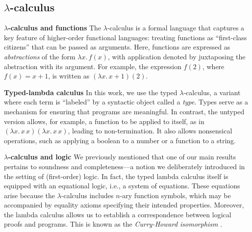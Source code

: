 


\subsection*{ $\lambda$-calculus}
\noindent \textbf{$\lambda$-calculus and functions}
The $\lambda$-calculus is a formal language that captures a key feature of higher-order functional languages: treating functions as ``first-class citizens'' that can be passed as arguments. Here, functions are expressed as \emph{abstractions} of the form $\lambda x.\,f(x)$, with application denoted by juxtaposing the abstraction with its argument. For example, the expression $f(2)$, where $f(x) = x + 1$, is written as $(\lambda x.\,x + 1)(2)$.



\noindent \textbf{Typed-lambda calculus}
In this work, we use the typed $\lambda$-calculus, a variant where each term is ``labeled'' by a syntactic object called a \emph{type}. Types serve as a mechanism for ensuring that programs are meaningful. In contrast, the untyped version allows, for example, a function to be applied to itself, as in $(\lambda x.\,x\,x)(\lambda x.\,x\,x)$, leading to non-termination. It also allows nonsensical operations, such as applying a boolean to a number or a function to a string.


\noindent \textbf{$\lambda$-calculus and logic} 
We previously mentioned that one of our main results pertains to soundness and completeness---a notion we deliberately introduced in the setting of (first-order) logic. In fact, the typed lambda calculus itself is equipped with an equational logic, i.e., a system of equations. These equations arise because the $\lambda$-calculus includes $n$-ary function symbols, which may be accompanied by equality axioms specifying their intended properties. Moreover, the lambda calculus allows us to establish a correspondence between logical proofs and programs. This is known as the \emph{Curry-Howard isomorphism} \cite{girardProofsTypes1989}.

 


